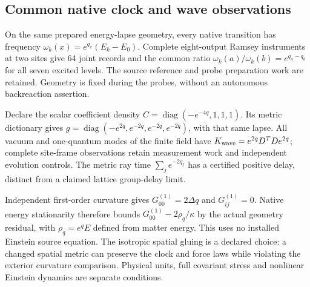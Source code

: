 \subsection{Common native clock and wave observations}
On the same prepared energy-lapse geometry, every native transition has
frequency $\omega_k(x)=e^{q_x}(E_k-E_0)$. Complete eight-output Ramsey
instruments at two sites give 64 joint records and the common ratio
$\omega_k(a)/\omega_k(b)=e^{q_a-q_b}$ for all seven excited levels.
The source reference and probe preparation work are retained. Geometry is
fixed during the probes, without an autonomous backreaction assertion.

Declare the scalar coefficient density
$C=\operatorname{diag}(-e^{-4q},1,1,1)$. Its metric dictionary gives
$g=\operatorname{diag}(-e^{2q},e^{-2q},e^{-2q},e^{-2q})$, with that same
lapse. All vacuum and one-quantum modes of the finite field have
$K_{\rm wave}=e^{2q}D^TD e^{2q}$; complete site-frame observations retain
measurement work and independent evolution controls. The metric ray time
$\sum_j e^{-2q_j}$ has a certified positive delay, distinct from a claimed
lattice group-delay limit.

Independent first-order curvature gives $G_{00}^{(1)}=2\Delta q$ and
$G_{ij}^{(1)}=0$. Native energy stationarity therefore bounds
$G_{00}^{(1)}-2\rho_q/\kappa$ by the actual geometry residual, with
$\rho_q=e^qE$ defined from matter energy. This uses no installed Einstein
source equation. The isotropic spatial gluing is a declared choice:
a changed spatial metric can preserve the clock and force laws while
violating the exterior curvature comparison. Physical units, full
covariant stress and nonlinear Einstein dynamics are separate conditions.
